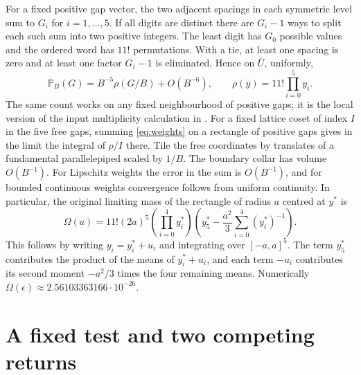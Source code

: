 \documentclass[11pt,reqno]{amsart}
\theoremstyle{remark}
\newcommand{\Prob}{\mathbb P}
\begin{document}
For a fixed positive gap vector, the two adjacent spacings in each symmetric level sum to \(G_i\) for \(i=1,\dots,5\). If all digits are distinct there are \(G_i-1\) ways to split each such sum into two positive integers. The least digit has \(G_0\) possible values and the ordered word has \(11!\) permutations. With a tie, at least one spacing is zero and at least one factor \(G_i-1\) is eliminated. Hence on \(\overline U\), uniformly,
\begin{equation}\label{eq:weights}
 \Prob_B(G)=B^{-5}\rho(G/B)+O(B^{-6}),\qquad
 \rho(y)=11!\prod_{i=0}^5 y_i .
\end{equation}
The same count works on any fixed neighbourhood of positive gaps; it is the local version of the input multiplicity calculation in \cite[\S4]{G4}.
For a fixed lattice coset of index \(I\) in the five free gaps, summing \eqref{eq:weights} on a rectangle of positive gaps gives in the limit the integral of \(\rho/I\) there. Tile the free coordinates by translates of a fundamental parallelepiped scaled by \(1/B\). The boundary collar has volume \(O(B^{-1})\). For Lipschitz weights the error in the sum is \(O(B^{-1})\), and for bounded continuous weights convergence follows from uniform continuity. In particular, the original limiting mass of the rectangle of radius \(a\) centred at \(y^*\) is
\begin{equation}\label{eq:mass}
 \Omega(a)=11!(2a)^5\left(\prod_{i=0}^4y^*_i\right)
       \left(y^*_5-\frac{a^2}{3}\sum_{i=0}^4(y^*_i)^{-1}\right).
\end{equation}
This follows by writing \(y_i=y^*_i+u_i\) and integrating over \([-a,a]^5\). The term \(y^*_5\) contributes the product of the means of \(y^*_i+u_i\), and each term \(-u_i\) contributes its second moment \(-a^2/3\) times the four remaining means. Numerically \(\Omega(\epsilon)\approx2.56103363166\cdot10^{-26}\).

\section{A fixed test and two competing returns}\label{sec:separation}
\end{document}

